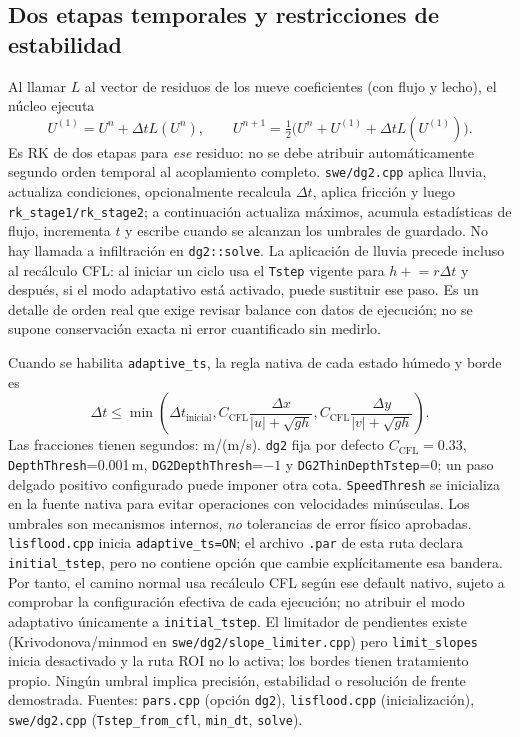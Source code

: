 \documentclass[11pt,a4paper]{article}
\newcommand{\src}[1]{\nolinkurl{#1}}
\begin{document}
\subsection{Dos etapas temporales y restricciones de estabilidad}
Al llamar $L$ al vector de residuos de los nueve coeficientes (con flujo y lecho), el núcleo ejecuta
\begin{equation}
 U^{(1)}=U^n+\Delta t L(U^n),\qquad
 U^{n+1}=\tfrac12\bigl(U^n+U^{(1)}+\Delta t L(U^{(1)})\bigr).\label{eq:rk}
\end{equation}
Es RK de dos etapas para \emph{ese} residuo: no se debe atribuir automáticamente segundo orden temporal al acoplamiento completo. \src{swe/dg2.cpp} aplica lluvia, actualiza condiciones, opcionalmente recalcula $\Delta t$, aplica fricción y luego \texttt{rk\_stage1/rk\_stage2}; a continuación actualiza máximos, acumula estadísticas de flujo, incrementa $t$ y escribe cuando se alcanzan los umbrales de guardado. No hay llamada a infiltración en \texttt{dg2::solve}. La aplicación de lluvia precede incluso al recálculo CFL: al iniciar un ciclo usa el \texttt{Tstep} vigente para $h\mathrel{+}=r\Delta t$ y después, si el modo adaptativo está activado, puede sustituir ese paso. Es un detalle de orden real que exige revisar balance con datos de ejecución; no se supone conservación exacta ni error cuantificado sin medirlo.

Cuando se habilita \texttt{adaptive\_ts}, la regla nativa de cada estado húmedo y borde es
\begin{equation}
 \Delta t\leq\min\!\left(\Delta t_{\mathrm{inicial}},
 C_{\mathrm{CFL}}\frac{\Delta x}{|u|+\sqrt{gh}},
 C_{\mathrm{CFL}}\frac{\Delta y}{|v|+\sqrt{gh}}\right).\label{eq:cfl}
\end{equation}
Las fracciones tienen segundos: m/(m/s). \texttt{dg2} fija por defecto $C_{\mathrm{CFL}}=0.33$, \texttt{DepthThresh}=0.001\,m, \texttt{DG2DepthThresh}=$-1$ y \texttt{DG2ThinDepthTstep}=0; un paso delgado positivo configurado puede imponer otra cota. \texttt{SpeedThresh} se inicializa en la fuente nativa para evitar operaciones con velocidades minúsculas. Los umbrales son mecanismos internos, \emph{no} tolerancias de error físico aprobadas. \src{lisflood.cpp} inicia \texttt{adaptive\_ts=ON}; el archivo \texttt{.par} de esta ruta declara \texttt{initial\_tstep}, pero no contiene opción que cambie explícitamente esa bandera. Por tanto, el camino normal usa recálculo CFL según ese default nativo, sujeto a comprobar la configuración efectiva de cada ejecución; no atribuir el modo adaptativo únicamente a \texttt{initial\_tstep}. El limitador de pendientes existe (Krivodonova/minmod en \src{swe/dg2/slope_limiter.cpp}) pero \texttt{limit\_slopes} inicia desactivado y la ruta ROI no lo activa; los bordes tienen tratamiento propio. Ningún umbral implica precisión, estabilidad o resolución de frente demostrada. Fuentes: \src{pars.cpp} (opción \texttt{dg2}), \src{lisflood.cpp} (inicialización), \src{swe/dg2.cpp} (\texttt{Tstep\_from\_cfl}, \texttt{min\_dt}, \texttt{solve}).
\end{document}
